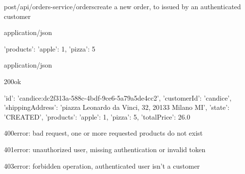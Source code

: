 \begin{apiRoute}{post}{/api/orders-service/orders}{create a new order, to issued by an authenticated customer}
	\begin{routeParameter}
	\end{routeParameter}
	\begin{routeRequest}{application/json}
		\begin{routeRequestBody}
{
    'products': { 'apple': 1, 
                   'pizza': 5 }
}
		\end{routeRequestBody}
	\end{routeRequest}
	\begin{routeResponse}{application/json}
	    \begin{routeResponseItem}{200}{ok}
	        \begin{routeResponseItemBody}
{   'id': 'candice:dc2f313a-588c-4bdf-9ce6-5a79a5de4cc2',
    'customerId': 'candice',
    'shippingAddress': 'piazza Leonardo da Vinci, 32, 20133 Milano MI',
    'state': 'CREATED',
    'products': {'apple': 1, 'pizza': 5},
    'totalPrice': 26.0
}
            \end{routeResponseItemBody}
	    \end{routeResponseItem}
        \begin{routeResponseItem}{400}{error: bad request, one or more requested products do not exist}
            \begin{routeResponseItemBody}
    	    \end{routeResponseItemBody} 
	    \end{routeResponseItem}
	    \begin{routeResponseItem}{401}{error: unauthorized user, missing authentication or invalid token}
    	    \begin{routeResponseItemBody}
			\end{routeResponseItemBody}
		\end{routeResponseItem}
	    \begin{routeResponseItem}{403}{error: forbidden operation, authenticated user isn't a customer}
    	    \begin{routeResponseItemBody}
		    \end{routeResponseItemBody}
	    \end{routeResponseItem}
	\end{routeResponse}
\end{apiRoute}

